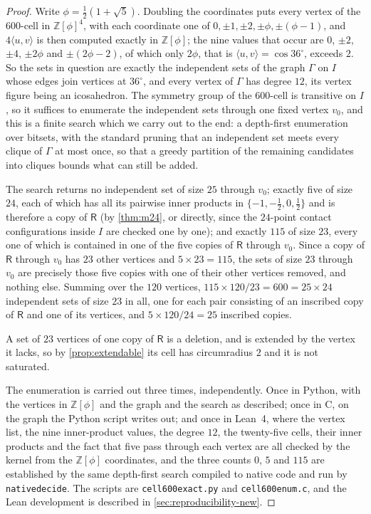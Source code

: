 \documentclass[11pt,reqno]{amsart}
\renewcommand{\_}{\origunderscore\allowbreak}
\numberwithin{equation}{section}
\theoremstyle{plain}
\theoremstyle{definition}
\theoremstyle{remark}
\newcommand{\Rt}{\mathsf{R}}                 %
\begin{document}
\begin{proof}
Write $\phi=\tfrac12(1+\sqrt5)$. Doubling the coordinates puts every
vertex of the $600$-cell in $\mathbb{Z}[\phi]^4$, with each coordinate
one of $0,\pm1,\pm2,\pm\phi,\pm(\phi-1)$, and $4\langle u,v\rangle$ is
then computed exactly in $\mathbb{Z}[\phi]$; the nine values that occur
are $0$, $\pm2$, $\pm4$, $\pm2\phi$ and $\pm(2\phi-2)$, of which only
$2\phi$, that is $\langle u,v\rangle=\cos36^\circ$, exceeds $2$. So the
sets in question are exactly the independent sets of the graph $\Gamma$
on $I$ whose edges join vertices at $36^\circ$, and every vertex of
$\Gamma$ has degree $12$, its vertex figure being an icosahedron. The
symmetry group of the $600$-cell is transitive on $I$, so it suffices to
enumerate the independent sets through one fixed vertex $v_0$, and this
is a finite search which we carry out to the end: a depth-first
enumeration over bitsets, with the standard pruning that an independent
set meets every clique of $\Gamma$ at most once, so that a greedy
partition of the remaining candidates into cliques bounds what can still
be added.

The search returns no independent set of size $25$ through $v_0$;
exactly five of size $24$, each of which has all its pairwise inner
products in $\{-1,-\tfrac12,0,\tfrac12\}$ and is therefore a copy of
$\Rt$ (by \cref{thm:m24}, or directly, since the $24$-point contact
configurations inside $I$ are checked one by one); and exactly $115$ of
size $23$, every one of which is contained in one of the five copies of
$\Rt$ through $v_0$. Since a copy of $\Rt$ through $v_0$ has $23$ other
vertices and $5\times23=115$, the sets of size $23$ through $v_0$ are
precisely those five copies with one of their other vertices removed,
and nothing else. Summing over the $120$ vertices, $115\times120/23=600
=25\times24$ independent sets of size $23$ in all, one for each pair
consisting of an inscribed copy of $\Rt$ and one of its vertices, and
$5\times120/24=25$ inscribed copies.

A set of $23$ vertices of one copy of $\Rt$ is a deletion, and is
extended by the vertex it lacks, so by \cref{prop:extendable} its cell
has circumradius $2$ and it is not saturated.

The enumeration is carried out three times, independently. Once in
Python, with the vertices in $\mathbb{Z}[\phi]$ and the graph and the
search as described; once in C, on the graph the Python script writes
out; and once in Lean~4, where the vertex list, the nine inner-product
values, the degree $12$, the twenty-five cells, their inner products and
the fact that five pass through each vertex are all checked by the
kernel from the $\mathbb{Z}[\phi]$ coordinates, and the three counts
$0$, $5$ and $115$ are established by the same depth-first search
compiled to native code and run by \texttt{native\_decide}. The scripts
are \texttt{cell600\_exact.py} and \texttt{cell600\_enum.c}, and the
Lean development is described in \cref{sec:reproducibility-new}.
\end{proof}
\end{document}

